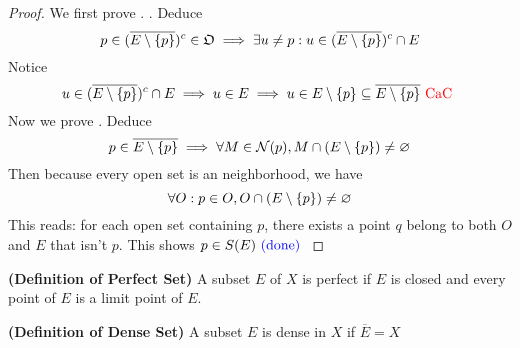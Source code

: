 \documentclass{report}
\begin{document}
\begin{proof}
We first prove  . . Deduce
\begin{equation}
p\in (\overline{E\setminus \{ p \}})^c \in \mathfrak{O}\implies \exists u\neq p: u\in (\overline{E\setminus \{ p \}})^c \cap E
\end{equation}
Notice
\begin{equation}
u\in (\overline{E\setminus \{ p \}})^c \cap E\implies u\in E\implies u\in E\setminus \{ p \}\subseteq \overline{E\setminus \{ p \}}\text{ \textcolor{red}{CaC} }
\end{equation}
Now we prove . Deduce
\begin{equation}
p\in \overline{E\setminus \{ p \}} \implies \forall M \in \mathcal{N}(p), M\cap (E\setminus \{ p \}) \neq \varnothing
\end{equation}
Then because every open set is an neighborhood, we have
\begin{equation}
\forall O: p \in O, O\cap (E\setminus \{ p \})\neq \varnothing
\end{equation}
This reads: for each open set containing $p$, there exists a point  $q$ belong to both $O$ and $E$ that isn't  $p$. This shows $p\in  S(E)\textcolor{blue}{\text{ (done) }}$ 

\end{proof}
\begin{definition}
\label{2.6.13}
\textbf{(Definition of Perfect Set)} A subset $E$ of  $X$ is perfect if  $E$ is closed and every point of  $E$ is a limit point of  $E$.
\end{definition}
\begin{definition}
\label{2.6.14}
\textbf{(Definition of Dense Set)} A subset $E$ is dense in $X$ if $\overline{E}=X$ 
\end{definition}
\end{document}

